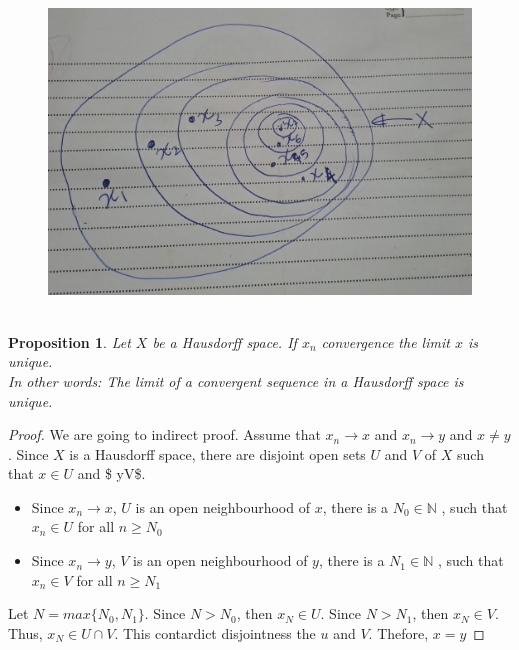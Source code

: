\documentclass[
]{book}
\providecommand{\tightlist}{%
  \setlength{\itemsep}{0pt}\setlength{\parskip}{0pt}}
\newtheorem{proposition}{Proposition}[chapter]
\theoremstyle{definition}
\theoremstyle{definition}
\theoremstyle{definition}
\theoremstyle{definition}
\theoremstyle{remark}
\begin{document}
\begin{figure}
\centering
\includegraphics{figures/figure 18.jpg}
\caption{\label{fig:fig18}\(~\)}
\end{figure}

\begin{proposition}
\protect\hypertarget{prp:unnamed-chunk-77}{}\label{prp:unnamed-chunk-77}Let \(X\) be a Hausdorff space. If \(x_n\) convergence the limit \(x\) is unique.\\
In other words: The limit of a convergent sequence in a Hausdorff space is unique.
\end{proposition}

\begin{proof}
We are going to indirect proof. Assume that \(x_n \to x\) and \(x_n \to y\) and \(x\neq y\). Since \(X\) is a Hausdorff space, there are disjoint open sets \(U\) and \(V\) of \(X\) such that \(x\in U\) and \$ y\in V\$.

\begin{itemize}
\tightlist
\item
  Since \(x_n \to x\), \(U\) is an open neighbourhood of \(x\), there is a \(N_0\in \mathbb{N}\) , such that \(x_n \in U\) for all \(n\geq N_0\)
\item
  Since \(x_n \to y\), \(V\) is an open neighbourhood of \(y\), there is a \(N_1\in \mathbb{N}\) , such that \(x_n \in V\) for all \(n\geq N_1\)
\end{itemize}

Let \(N=max\{N_0,N_1\}\).
Since \(N>N_0\), then \(x_N\in U\).
Since \(N>N_1\), then \(x_N\in V\).
Thus, \(x_N\in U \cap V\). This contardict disjointness the \(u\) and \(V\). Thefore, \(x=y\)
\end{proof}
\end{document}
